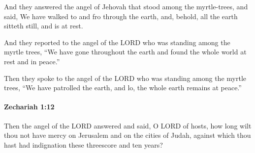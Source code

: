			\begin{versebox}
					\item[BHS] 
					\item[LXX] 
					\item[ASV] And they answered the angel of Jehovah that stood among the myrtle-trees, and said, We have walked to and fro through the earth, and, behold, all the earth sitteth still, and is at rest.
					\item[NIV] And they reported to the angel of the LORD who was standing among the myrtle trees, “We have gone throughout the earth and found the whole world at rest and in peace.”
					\item[NRSV] Then they spoke to the angel of the LORD who was standing among the myrtle trees, “We have patrolled the earth, and lo, the whole earth remains at peace.”
			\end{versebox}

		\paragraph{Zechariah 1:12} %
			\label{ZECHARIAH-1-12}

			Then the angel of the LORD answered and said, O LORD of hosts, how long wilt thou not have mercy on Jerusalem and on the cities of Judah, against which thou hast had indignation these threescore and ten years?

